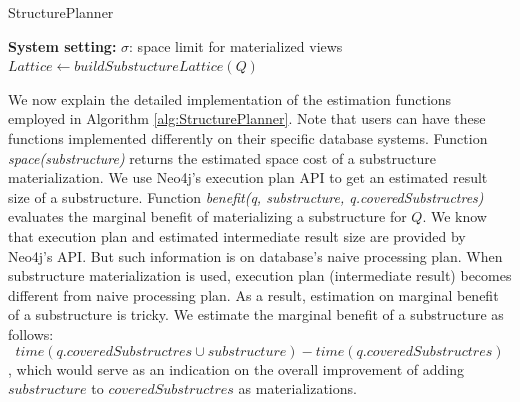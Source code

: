 \begin{algorithm}%
\label{alg:5}
\caption{StructurePlanner}
\LinesNumbered
\textbf{System setting:} $\sigma$: space limit for materialized views\\
$Lattice \leftarrow buildSubstuctureLattice(Q)$\;
\end{algorithm}

We now explain the detailed implementation of the estimation functions employed in Algorithm \ref{alg:StructurePlanner}. Note that users can have these functions implemented differently on their specific database systems. Function \textit{space(substructure)} returns the estimated space cost of a substructure materialization. We use Neo4j's execution plan API to get an estimated result size of a substructure. Function \textit{benefit(q, substructure, q.coveredSubstructres)} evaluates the marginal benefit of materializing a substructure for $Q$. We know that execution plan and estimated intermediate result size are provided by Neo4j's API. But such information is on database's naive processing plan. When substructure materialization is used, execution plan (intermediate result) becomes different from naive processing plan. As a result, estimation on marginal benefit of a substructure is tricky. We estimate the marginal benefit of a substructure as follows:
\begin{displaymath}
time(q.coveredSubstructres \cup substructure) - time(q.coveredSubstructres)
\end{displaymath}
\noindent , which would serve as an indication on the overall improvement of adding $substructure$ to $coveredSubstructres$ as materializations.


